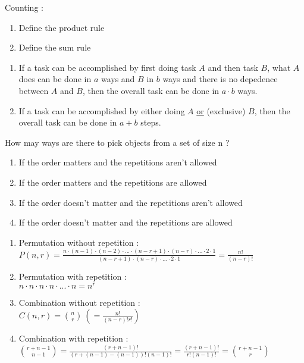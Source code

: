 \documentclass[12pt]{article}
\newcommand*{\xfield}[1]{\begin{mdframed}\centering #1\end{mdframed}\bigskip}
\newenvironment{note}{}{}
\begin{document}
\begin{note}
Counting :
	\xfield{\begin{enumerate}
		\item Define the product rule
		\item Define the sum rule
	\end{enumerate} }
	\xfield{\begin{enumerate}
		\item If a task can be accomplished by first doing task $A$ and then task $B$, what $A$ does can be done in $a$ ways and $B$ in $b$ ways and there is no depedence between $A$ and $B$, then the overall task can be done in $a\cdot b$ ways. 
		\item If a task can be accomplished by either doing $A$ \underline{or} (exclusive) $B$, then the overall task can be done in $a+b$ steps.
	\end{enumerate} }
\end{note}

\begin{note}
	\xfield{How may ways are there to pick objects from a set of size n ?\begin{enumerate}
		\item If the order matters and the repetitions aren't allowed
		\item If the order matters and the repetitions are allowed
		\item If the order doesn't matter and the repetitions aren't allowed
		\item If the order doesn't matter and the repetitions are allowed
	\end{enumerate} }
	\xfield{\begin{enumerate}
		\item Permutation without repetition :\\
			$P(n,r) = \frac{n\cdot(n-1)\cdot(n-2)\cdot ...\cdot(n-r+1)\cdot(n-r)\cdot ...\cdot 2\cdot 1}{(n-r+1)\cdot (n-r)\cdot ... \cdot 2 \cdot 1} = \frac{n!}{(n-r)!}$
		\item Permutation with repetition :\\
		$n\cdot n\cdot n \cdot n \cdot ... \cdot n = n^r$
		\item Combination without repetition :\\
		$C(n,r) = \binom{n}{r}\ (=\frac{n!}{(n-r)!r!})$
		\item Combination with repetition :\\
		$\binom{r+n-1}{n-1} = \frac{(r+n-1)!}{(r+(n-1)-(n-1))!(n-1)!} = \frac{(r+n-1)!}{r!(n-1)!} = \binom{r+n-1}{r}$
	\end{enumerate} }
\end{note}
\end{document}
